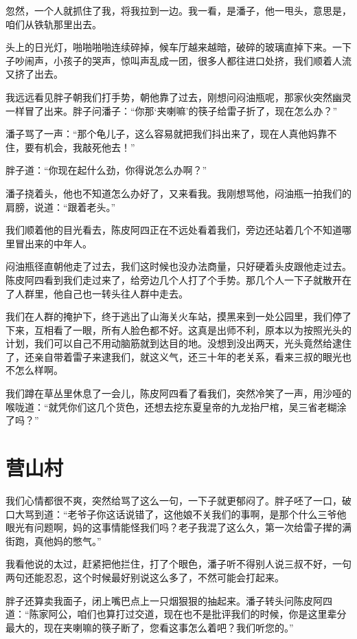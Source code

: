 忽然，一个人就抓住了我，将我拉到一边。我一看，是潘子，他一甩头，意思是，咱们从铁轨那里出去。

头上的日光灯，啪啪啪啪连续碎掉，候车厅越来越暗，破碎的玻璃直掉下来。一下子吵闹声，小孩子的哭声，惊叫声乱成一团，很多人都往进口处挤，我们顺着人流又挤了出去。

我远远看见胖子朝我们打手势，朝他靠了过去，刚想问闷油瓶呢，那家伙突然幽灵一样冒了出来。胖子问潘子：“你那‘夹喇嘛’的筷子给雷子折了，现在怎么办？”

潘子骂了一声：“那个龟儿子，这么容易就把我们抖出来了，现在人真他妈靠不住，要有机会，我敲死他去！”

胖子道：“你现在起什么劲，你得说怎么办啊？”

潘子挠着头，他也不知道怎么办好了，又来看我。我刚想骂他，闷油瓶一拍我们的肩膀，说道：“跟着老头。”

我们顺着他的目光看去，陈皮阿四正在不远处看着我们，旁边还站着几个不知道哪里冒出来的中年人。

闷油瓶径直朝他走了过去，我们这时候也没办法商量，只好硬着头皮跟他走过去。陈皮阿四看到我们走过来了，给旁边几个人打了个手势。那几个人一下子就散开在了人群里，他自己也一转头往人群中走去。

我们在人群的掩护下，终于逃出了山海关火车站，摸黑来到一处公园里，我们停了下来，互相看了一眼，所有人脸色都不好。这真是出师不利，原本以为按照光头的计划，我们可以自己不用动脑筋就到达目的地。没想到没出两天，光头竟然给逮住了，还亲自带着雷子来逮我们，就这义气，还三十年的老关系，看来三叔的眼光也不怎么样啊。

我们蹲在草丛里休息了一会儿，陈皮阿四看了看我们，突然冷笑了一声，用沙哑的喉咙道：“就凭你们这几个货色，还想去挖东夏皇帝的九龙抬尸棺，吴三省老糊涂了吗？”

\chapter{营山村}

我们心情都很不爽，突然给骂了这么一句，一下子就更郁闷了。胖子呸了一口，破口大骂到道：“老爷子你这话说错了，这他娘不关我们的事啊，是那个什么三爷他眼光有问题啊，妈的这事情能怪我们吗？老子我混了这么久，第一次给雷子撵的满街跑，真他妈的憋气。”

我看他说的太过，赶紧把他拦住，打了个眼色，潘子听不得别人说三叔不好，一句两句还能忍忍，这个时候最好别说这么多了，不然可能会打起来。

胖子还算卖我面子，闭上嘴巴点上一只烟狠狠的抽起来。潘子转头问陈皮阿四道：“陈家阿公，咱们也算打过交道，现在也不是批评我们的时候，你是这里辈分最大的，现在夹喇嘛的筷子断了，您看这事怎么着吧？我们听您的。”

